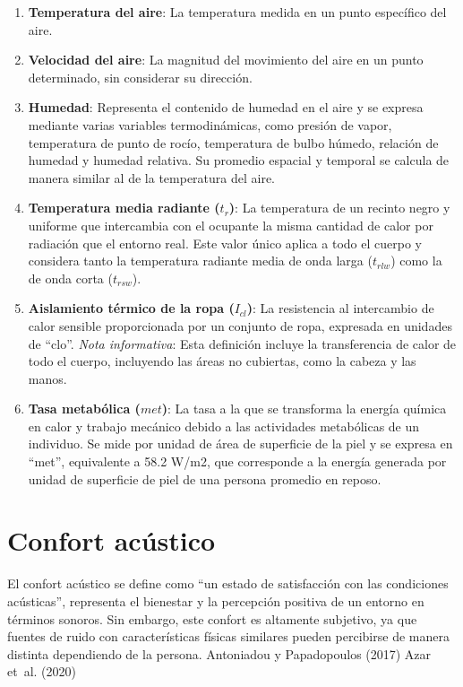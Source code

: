 \documentclass[
  letterpaper,
]{scrbook}
\begin{document}
\begin{enumerate}
\def\labelenumi{\arabic{enumi}.}
\item
  \textbf{Temperatura del aire}: La temperatura medida en un punto
  específico del aire.
\item
  \textbf{Velocidad del aire}: La magnitud del movimiento del aire en un
  punto determinado, sin considerar su dirección.
\item
  \textbf{Humedad}: Representa el contenido de humedad en el aire y se
  expresa mediante varias variables termodinámicas, como presión de
  vapor, temperatura de punto de rocío, temperatura de bulbo húmedo,
  relación de humedad y humedad relativa. Su promedio espacial y
  temporal se calcula de manera similar al de la temperatura del aire.
\item
  \textbf{Temperatura media radiante (\(t_{r}\))}: La temperatura de un
  recinto negro y uniforme que intercambia con el ocupante la misma
  cantidad de calor por radiación que el entorno real. Este valor único
  aplica a todo el cuerpo y considera tanto la temperatura radiante
  media de onda larga (\(t_{rlw}\)) como la de onda corta (\(t_{rsw}\)).
\item
  \textbf{Aislamiento térmico de la ropa (\(I_{cl}\))}: La resistencia
  al intercambio de calor sensible proporcionada por un conjunto de
  ropa, expresada en unidades de ``clo''. \emph{Nota informativa}: Esta
  definición incluye la transferencia de calor de todo el cuerpo,
  incluyendo las áreas no cubiertas, como la cabeza y las manos.
\item
  \textbf{Tasa metabólica (\(met\))}: La tasa a la que se transforma la
  energía química en calor y trabajo mecánico debido a las actividades
  metabólicas de un individuo. Se mide por unidad de área de superficie
  de la piel y se expresa en ``met'', equivalente a 58.2 W/m2, que
  corresponde a la energía generada por unidad de superficie de piel de
  una persona promedio en reposo.
\end{enumerate}

\section{Confort acústico}\label{confort-acuxfastico}

El confort acústico se define como ``un estado de satisfacción con las
condiciones acústicas'', representa el bienestar y la percepción
positiva de un entorno en términos sonoros. Sin embargo, este confort es
altamente subjetivo, ya que fuentes de ruido con características físicas
similares pueden percibirse de manera distinta dependiendo de la
persona. Antoniadou y Papadopoulos (2017) Azar et~al. (2020)
\end{document}
